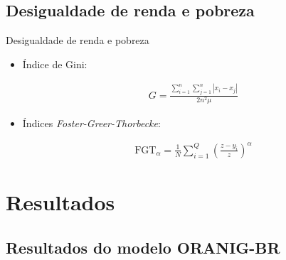 \documentclass[10pt]{sintefbeamer}
\begin{document}
\subsection{Desigualdade de renda e pobreza}

\begin{frame}{Desigualdade de renda e pobreza}
	\begin{itemize}
		\item Índice de Gini:
		
		\begin{align}
			G = \frac{\sum_{i=1}^{n}\sum_{j=1}^{n} | x_i - x_j |}{2n^{2}\mu} \label{eq:gini}
		\end{align}

		\item Índices \textit{Foster-Greer-Thorbecke}:
		
		\begin{align}
			\text{FGT}_\alpha = \frac{1}{N} \sum_{i=1}^{Q} \left( \frac{z - y_i}{z} \right)^{\alpha}
		\end{align}

	\end{itemize}
\end{frame}



\section{Resultados}

\subsection{Resultados do modelo ORANIG-BR}
\end{document}
